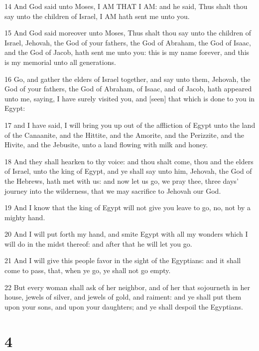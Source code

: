 \par 14 And God said unto Moses, I AM THAT I AM: and he said, Thus shalt thou say unto the children of Israel, I AM hath sent me unto you.
\par 15 And God said moreover unto Moses, Thus shalt thou say unto the children of Israel, Jehovah, the God of your fathers, the God of Abraham, the God of Isaac, and the God of Jacob, hath sent me unto you: this is my name forever, and this is my memorial unto all generations.
\par 16 Go, and gather the elders of Israel together, and say unto them, Jehovah, the God of your fathers, the God of Abraham, of Isaac, and of Jacob, hath appeared unto me, saying, I have surely visited you, and [seen] that which is done to you in Egypt:
\par 17 and I have said, I will bring you up out of the affliction of Egypt unto the land of the Canaanite, and the Hittite, and the Amorite, and the Perizzite, and the Hivite, and the Jebusite, unto a land flowing with milk and honey.
\par 18 And they shall hearken to thy voice: and thou shalt come, thou and the elders of Israel, unto the king of Egypt, and ye shall say unto him, Jehovah, the God of the Hebrews, hath met with us: and now let us go, we pray thee, three days' journey into the wilderness, that we may sacrifice to Jehovah our God.
\par 19 And I know that the king of Egypt will not give you leave to go, no, not by a mighty hand.
\par 20 And I will put forth my hand, and smite Egypt with all my wonders which I will do in the midst thereof: and after that he will let you go.
\par 21 And I will give this people favor in the sight of the Egyptians: and it shall come to pass, that, when ye go, ye shall not go empty.
\par 22 But every woman shall ask of her neighbor, and of her that sojourneth in her house, jewels of silver, and jewels of gold, and raiment: and ye shall put them upon your sons, and upon your daughters; and ye shall despoil the Egyptians.

\chapter{4}

